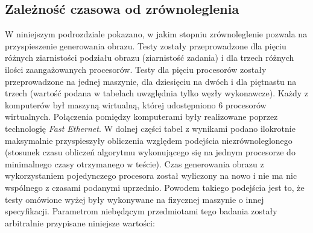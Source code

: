\subsection{Zależność czasowa od zrównoleglenia}

W niniejszym podrozdziale pokazano, w jakim stopniu zrównoleglenie pozwala na przyspieszenie generowania obrazu. Testy zostały przeprowadzone dla pięciu różnych ziarnistości podziału obrazu (ziarnistość zadania) i dla trzech różnych ilości zaangażowanych procesorów. Testy dla pięciu procesorów zostały przeprowadzone na jednej maszynie, dla dziesięciu na dwóch i dla piętnastu na trzech (wartość podana w tabelach uwzględnia tylko węzły wykonawcze). Każdy z komputerów był maszyną wirtualną, której udostępniono 6 procesorów wirtualnych. Połączenia pomiędzy komputerami były realizowane poprzez technologię \emph{Fast Ethernet}. W dolnej części tabel z wynikami podano ilokrotnie maksymalnie przyspieszyły obliczenia względem podejścia niezrównoleglonego (stosunek czasu obliczeń algorytmu wykonującego się na jednym procesorze do minimalnego czasy otrzymanego w teście). Czas generowania obrazu z wykorzystaniem pojedynczego procesora został wyliczony na nowo i nie ma nic wspólnego z czasami podanymi uprzednio. Powodem takiego podejścia jest to, że testy omówione wyżej były wykonywane na fizycznej maszynie o innej specyfikacji. Parametrom niebędącym przedmiotami tego badania zostały arbitralnie przypisane niniejsze wartości:

